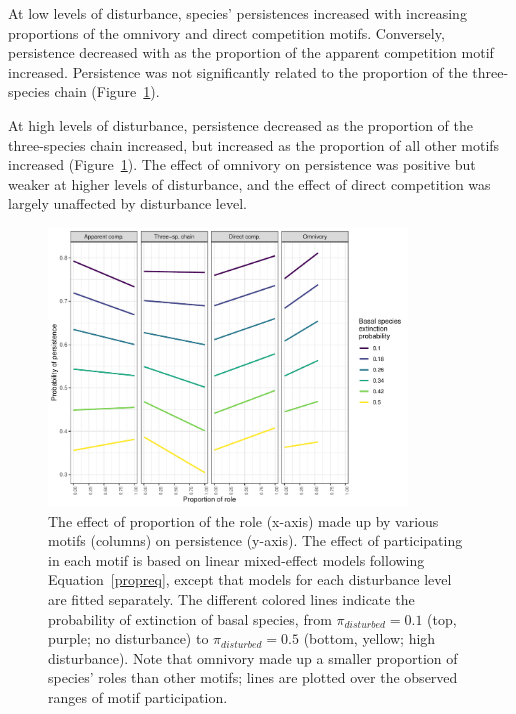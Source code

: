 \documentclass[12pt]{article}
\begin{document}
\begin{spacing}{2.0}
            At low levels of disturbance, species' persistences increased with increasing proportions of the omnivory and direct competition motifs. Conversely, persistence decreased with as the  proportion of the apparent competition motif increased. Persistence was not significantly related to the proportion of the three-species chain (Figure~\ref{fig:prop_lmer_all}).
            
            At high levels of disturbance, persistence decreased as the proportion of the three-species chain increased, but increased as the proportion of all other motifs increased (Figure~\ref{fig:prop_lmer_all}).
            The effect of omnivory on persistence was  positive but weaker at higher levels of disturbance, and the effect of direct competition was largely unaffected by disturbance level.
    
            
            \begin{figure}[h!]
                \centering
                \includegraphics[width=0.85\textwidth]{figures/prop_lmer_allCS.pdf}
                \caption{The effect of proportion of the role (x-axis) made up by various motifs (columns) on persistence (y-axis). The effect of participating in each motif is based on linear mixed-effect models following Equation~\ref{propreq}, except that models for each  disturbance level are fitted separately. The different colored lines indicate the probability of extinction of basal species, from $\pi_{disturbed} = 0.1$ (top, purple; no disturbance) to $\pi_{disturbed} = 0.5$ (bottom, yellow; high disturbance). Note that omnivory made up a smaller proportion of species' roles than other motifs; lines are plotted over the observed ranges of motif participation.}
                \label{fig:prop_lmer_all}
            \end{figure}
        

\end{spacing}
\end{document}
